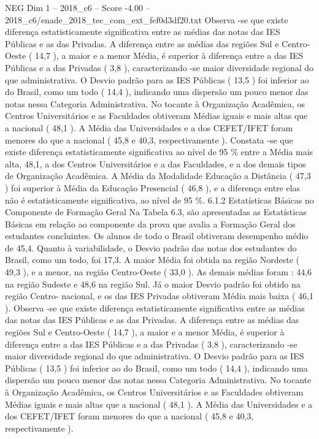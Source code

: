 \begin{textsample}{NEG Dim 1 – 2018\_c6 – Score -4.00 – 2018\_c6/enade\_2018\_tec\_com\_ext\_fef0d3df20.txt}
Observa -se que existe diferença estatisticamente significativa entre as médias das notas das IES Públicas e as das Privadas.
A diferença entre as médias das regiões Sul e Centro-Oeste ( 14,7 ), a maior e a menor Média, é superior à diferença entre a das IES Públicas e a das Privadas ( 3,8 ), caracterizando -se maior diversidade regional do que administrativa.
O Desvio padrão para as IES Públicas ( 13,5 ) foi inferior ao do Brasil, como um todo ( 14,4 ), indicando uma dispersão um pouco menor das notas nessa Categoria Administrativa.
No tocante à Organização Acadêmica, os Centros Universitários e as Faculdades obtiveram Médias iguais e mais altas que a nacional ( 48,1 ).
A Média das Universidades e a dos CEFET/IFET foram menores do que a nacional ( 45,8 e 40,3, respectivamente ).
Constata -se que existe diferença estatisticamente significativa ao nível de 95 \% entre a Média mais alta, 48,1, a dos Centros Universitários e a das Faculdades, e a dos demais tipos de Organização Acadêmica.
A Média da Modalidade Educação a Distância ( 47,3 ) foi superior à Média da Educação Presencial ( 46,8 ), e a diferença entre elas não é estatisticamente significativa, ao nível de 95 \%. 6.1.2 Estatísticas Básicas no Componente de Formação Geral Na Tabela 6.3, são apresentadas as Estatísticas Básicas em relação ao componente da prova que avalia a Formação Geral dos estudantes concluintes.
Os alunos de todo o Brasil obtiveram desempenho médio de 45,4.
Quanto à variabilidade, o Desvio padrão das notas dos estudantes do Brasil, como um todo, foi 17,3.
A maior Média foi obtida na região Nordeste ( 49,3 ), e a menor, na região Centro-Oeste ( 33,0 ).
As demais médias foram : 44,6 na região Sudeste e 48,6 na região Sul.
Já o maior Desvio padrão foi obtido na região Centro- nacional, e os das IES Privadas obtiveram Média mais baixa ( 46,1 ).
Observa -se que existe diferença estatisticamente significativa entre as médias das notas das IES Públicas e as das Privadas.
A diferença entre as médias das regiões Sul e Centro-Oeste ( 14,7 ), a maior e a menor Média, é superior à diferença entre a das IES Públicas e a das Privadas ( 3,8 ), caracterizando -se maior diversidade regional do que administrativa.
O Desvio padrão para as IES Públicas ( 13,5 ) foi inferior ao do Brasil, como um todo ( 14,4 ), indicando uma dispersão um pouco menor das notas nessa Categoria Administrativa.
No tocante à Organização Acadêmica, os Centros Universitários e as Faculdades obtiveram Médias iguais e mais altas que a nacional ( 48,1 ).
A Média das Universidades e a dos CEFET/IFET foram menores do que a nacional ( 45,8 e 40,3, respectivamente ).

\end{textsample}
